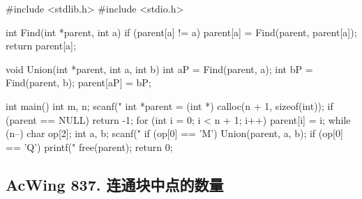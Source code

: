 \begin{mycpptwocol}[合并集合]
    #include <stdlib.h>
    #include <stdio.h>

    int Find(int *parent, int a) {
        if (parent[a] != a) {
            parent[a] = Find(parent, parent[a]);
        }
        return parent[a];
    }

    void Union(int *parent, int a, int b) {
        int aP = Find(parent, a);
        int bP = Find(parent, b);
        parent[aP] = bP;
    }

    int main() {
        int m, n;
        scanf("%
        int *parent = (int *) calloc(n + 1, sizeof(int));
        if (parent == NULL) {
            return -1;
        }
        for (int i = 0; i < n + 1; i++) {
            parent[i] = i;
        }
        while (n--) {
            char op[2];
            int a, b;
            scanf("%
            if (op[0] == 'M') {
                Union(parent, a, b);
            }
            if (op[0] == 'Q') {
                printf("%
            }
        }
        free(parent);
        return 0;
    }
\end{mycpptwocol}

\subsection{AcWing 837. 连通块中点的数量}

